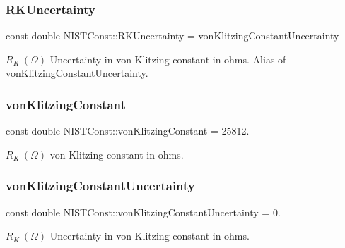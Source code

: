 \subsubsection{\texorpdfstring{R\+K\+Uncertainty}{RKUncertainty}}
{\footnotesize\ttfamily const double N\+I\+S\+T\+Const\+::\+R\+K\+Uncertainty = von\+Klitzing\+Constant\+Uncertainty}

$R_K \ (\Omega)$ Uncertainty in von Klitzing constant in ohms. Alias of von\+Klitzing\+Constant\+Uncertainty. \mbox{\label{group__von_klitzing_constant_ga664441cab64a6a8feda702f6354c1e7f}} 
\subsubsection{\texorpdfstring{von\+Klitzing\+Constant}{vonKlitzingConstant}}
{\footnotesize\ttfamily const double N\+I\+S\+T\+Const\+::von\+Klitzing\+Constant = 25812.}

$R_K \ (\Omega)$ von Klitzing constant in ohms. \mbox{\label{group__von_klitzing_constant_ga8fa7b05f4ab4958f9bed81f592304e49}} 
\subsubsection{\texorpdfstring{von\+Klitzing\+Constant\+Uncertainty}{vonKlitzingConstantUncertainty}}
{\footnotesize\ttfamily const double N\+I\+S\+T\+Const\+::von\+Klitzing\+Constant\+Uncertainty = 0.}

$R_K \ (\Omega)$ Uncertainty in von Klitzing constant in ohms. 